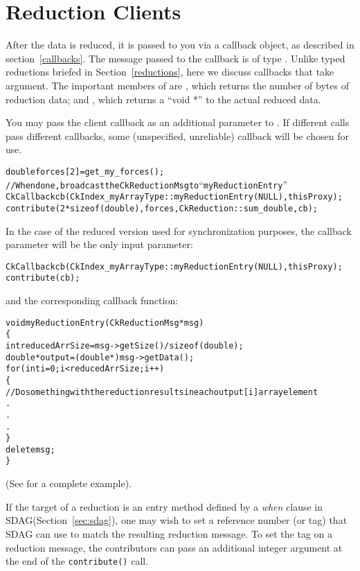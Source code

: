\section{Reduction Clients}

\label{reductionClients}

After the data is reduced, it is passed to you via a callback object,
as described in section~\ref{callbacks}.  The message passed to
the callback is of type . Unlike typed reductions
briefed in Section~\ref{reductions}, here we discuss callbacks that take 
 argument.
The important members of  are
, which returns the number of bytes of reduction data; and
, which returns a ``void *'' to the actual reduced data.

You may pass the client callback as an additional parameter to .
If different  calls pass different callbacks, some (unspecified,
unreliable) callback will be chosen for use.
\begin{alltt}
    double forces[2]=get_my_forces();
    // When done, broadcast the CkReductionMsg to ``myReductionEntry''
    CkCallback cb(CkIndex_myArrayType::myReductionEntry(NULL), thisProxy);
    contribute(2*sizeof(double), forces,CkReduction::sum_double, cb);
\end{alltt}

In the case of the reduced version used for synchronization purposes, the
callback parameter will be the only input parameter:
\begin{alltt}
    CkCallback cb(CkIndex_myArrayType::myReductionEntry(NULL), thisProxy);
    contribute(cb);
\end{alltt}

and the corresponding callback function:

\begin{alltt}
void myReductionEntry(CkReductionMsg *msg)
\{
  int reducedArrSize=msg->getSize() / sizeof(double);
  double *output=(double *) msg->getData();
  for(int i=0 ; i<reducedArrSize ; i++)
  \{
   // Do something with the reduction results in each output[i] array element
   .
   .
   .
  \}
  delete msg;
\}
\end{alltt}

(See  for a complete example).

If the target of a reduction is an entry method defined by a
\emph{when} clause in SDAG(Section~\ref{sec:sdag}), one may wish to set a
reference number (or tag) that SDAG can use to match the resulting
reduction message. To set the tag on a reduction message, the
contributors can pass an additional integer argument at the end of the
{\tt contribute()} call.

